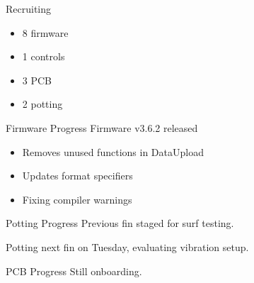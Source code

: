 \begin{frame}{Recruiting}
    \begin{itemize}
      \item 8 firmware
      \item 1 controls
      \item 3 PCB
      \item 2 potting
    \end{itemize}
\end{frame}

\begin{frame}{Firmware Progress}
  Firmware v3.6.2 released
  \begin{itemize}
    \item Removes unused functions in DataUpload 
    \item Updates format specifiers
    \item Fixing compiler warnings
  \end{itemize}
\end{frame}

\begin{frame}{Potting Progress}
  Previous fin staged for surf testing.

  Potting next fin on Tuesday, evaluating vibration setup.
\end{frame}

\begin{frame}{PCB Progress}
  Still onboarding.
\end{frame}



